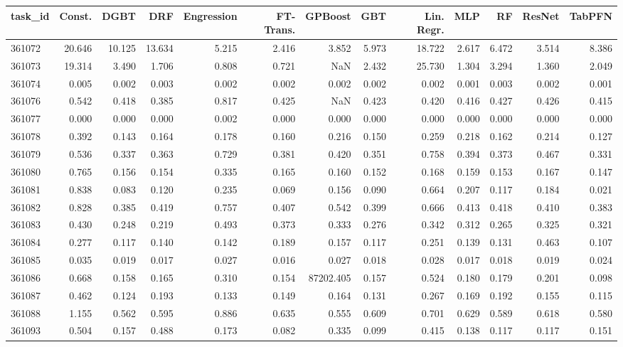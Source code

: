 \begin{tabular}{lrrrrrrrrrrrr}
\toprule
task\_id & Const. & DGBT & DRF & Engression & FT-Trans. & GPBoost & GBT & Lin. Regr. & MLP & RF & ResNet & TabPFN \\
\midrule
361072 & 20.646 & 10.125 & 13.634 & 5.215 & 2.416 & 3.852 & 5.973 & 18.722 & 2.617 & 6.472 & 3.514 & 8.386 \\
361073 & 19.314 & 3.490 & 1.706 & 0.808 & 0.721 & NaN & 2.432 & 25.730 & 1.304 & 3.294 & 1.360 & 2.049 \\
361074 & 0.005 & 0.002 & 0.003 & 0.002 & 0.002 & 0.002 & 0.002 & 0.002 & 0.001 & 0.003 & 0.002 & 0.001 \\
361076 & 0.542 & 0.418 & 0.385 & 0.817 & 0.425 & NaN & 0.423 & 0.420 & 0.416 & 0.427 & 0.426 & 0.415 \\
361077 & 0.000 & 0.000 & 0.000 & 0.002 & 0.000 & 0.000 & 0.000 & 0.000 & 0.000 & 0.000 & 0.000 & 0.000 \\
361078 & 0.392 & 0.143 & 0.164 & 0.178 & 0.160 & 0.216 & 0.150 & 0.259 & 0.218 & 0.162 & 0.214 & 0.127 \\
361079 & 0.536 & 0.337 & 0.363 & 0.729 & 0.381 & 0.420 & 0.351 & 0.758 & 0.394 & 0.373 & 0.467 & 0.331 \\
361080 & 0.765 & 0.156 & 0.154 & 0.335 & 0.165 & 0.160 & 0.152 & 0.168 & 0.159 & 0.153 & 0.167 & 0.147 \\
361081 & 0.838 & 0.083 & 0.120 & 0.235 & 0.069 & 0.156 & 0.090 & 0.664 & 0.207 & 0.117 & 0.184 & 0.021 \\
361082 & 0.828 & 0.385 & 0.419 & 0.757 & 0.407 & 0.542 & 0.399 & 0.666 & 0.413 & 0.418 & 0.410 & 0.383 \\
361083 & 0.430 & 0.248 & 0.219 & 0.493 & 0.373 & 0.333 & 0.276 & 0.342 & 0.312 & 0.265 & 0.325 & 0.321 \\
361084 & 0.277 & 0.117 & 0.140 & 0.142 & 0.189 & 0.157 & 0.117 & 0.251 & 0.139 & 0.131 & 0.463 & 0.107 \\
361085 & 0.035 & 0.019 & 0.017 & 0.027 & 0.016 & 0.027 & 0.018 & 0.028 & 0.017 & 0.018 & 0.019 & 0.024 \\
361086 & 0.668 & 0.158 & 0.165 & 0.310 & 0.154 & 87202.405 & 0.157 & 0.524 & 0.180 & 0.179 & 0.201 & 0.098 \\
361087 & 0.462 & 0.124 & 0.193 & 0.133 & 0.149 & 0.164 & 0.131 & 0.267 & 0.169 & 0.192 & 0.155 & 0.115 \\
361088 & 1.155 & 0.562 & 0.595 & 0.886 & 0.635 & 0.555 & 0.609 & 0.701 & 0.629 & 0.589 & 0.618 & 0.580 \\
361093 & 0.504 & 0.157 & 0.488 & 0.173 & 0.082 & 0.335 & 0.099 & 0.415 & 0.138 & 0.117 & 0.117 & 0.151 \\

\end{tabular}
